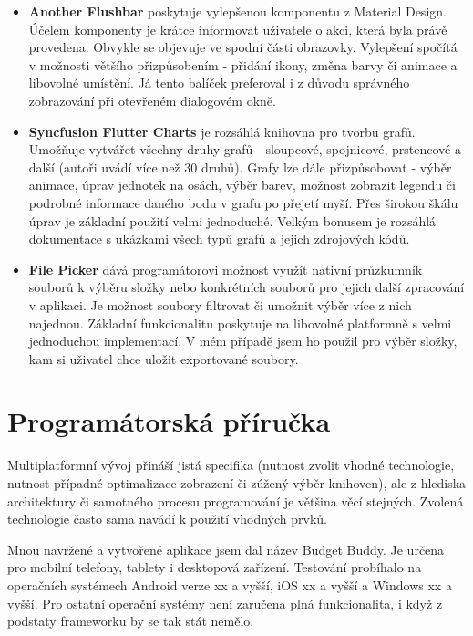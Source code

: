 \documentclass[
  biblatex,
  figures=true,
  tables=false,
  glossaries,
  index
]{kidiplom}
\begin{document}
\begin{itemize}
  \item \textbf{Another Flushbar} poskytuje vylepšenou komponentu  z Material Design. Účelem komponenty je krátce informovat uživatele o akci, která byla právě provedena. Obvykle se objevuje ve spodní části obrazovky. Vylepšení spočítá v možnosti většího přizpůsobením - přidání ikony, změna barvy či animace a libovolné umístění. Já tento balíček preferoval i z důvodu správného zobrazování při otevřeném dialogovém okně.
  \item \textbf{Syncfusion Flutter Charts} je rozsáhlá knihovna pro tvorbu grafů. Umožňuje vytvářet všechny druhy grafů - sloupcové, spojnicové, prstencové a další (autoři uvádí více než 30 druhů). Grafy lze dále přizpůsobovat - výběr animace, úprav jednotek na osách, výběr barev, možnost zobrazit legendu či podrobné informace daného bodu v grafu po přejetí myší. Přes širokou škálu úprav je základní použití velmi jednoduché. Velkým bonusem je rozsáhlá dokumentace s ukázkami všech typů grafů a jejich zdrojových kódů.
  \item \textbf{File Picker} dává programátorovi možnost využít nativní průzkumník souborů k výběru složky nebo konkrétních souborů pro jejich další zpracování v aplikaci. Je možnost soubory filtrovat či umožnit výběr více z nich najednou. Základní funkcionalitu poskytuje na libovolné platformně s velmi jednoduchou implementací. V mém případě jsem ho použil pro výběr složky, kam si uživatel chce uložit exportované soubory. 

\end{itemize}


\section{Programátorská příručka}

Multiplatformní vývoj přináší jistá specifika (nutnost zvolit vhodné technologie, nutnost případné optimalizace zobrazení či zúžený výběr knihoven), ale z hlediska architektury či samotného procesu programování je většina věcí stejných. Zvolená technologie často sama navádí k použití vhodných prvků.

Mnou navržené a vytvořené aplikace jsem dal název Budget Buddy. Je určena pro mobilní telefony, tablety i desktopová zařízení. Testování probíhalo na operačních systémech Android verze xx a vyšší, iOS xx a vyšší a Windows xx a vyšší. Pro ostatní operační systémy není zaručena plná funkcionalita, i když z podstaty frameworku by se tak stát nemělo.
\end{document}
